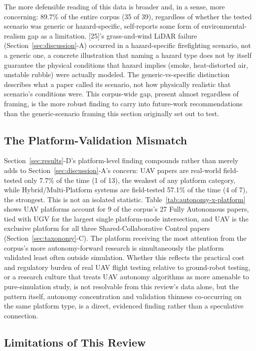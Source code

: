 \documentclass[journal]{IEEEtran}
\begin{document}
The more defensible reading of this data is broader and, in a sense, more concerning: 89.7\% of the entire corpus (35 of 39), regardless of whether the tested scenario was generic or hazard-specific, self-reports some form of environmental-realism gap as a limitation. [25]'s grass-and-wind LiDAR failure (Section~\ref{sec:discussion}-A) occurred in a hazard-specific firefighting scenario, not a generic one, a concrete illustration that naming a hazard type does not by itself guarantee the physical conditions that hazard implies (smoke, heat-distorted air, unstable rubble) were actually modeled. The generic-vs-specific distinction describes what a paper called its scenario, not how physically realistic that scenario's conditions were. This corpus-wide gap, present almost regardless of framing, is the more robust finding to carry into future-work recommendations than the generic-scenario framing this section originally set out to test.

\subsection{The Platform-Validation Mismatch}

Section~\ref{sec:results}-D's platform-level finding compounds rather than merely adds to Section~\ref{sec:discussion}-A's concern: UAV papers are real-world field-tested only 7.7\% of the time (1 of 13), the weakest of any platform category, while Hybrid/Multi-Platform systems are field-tested 57.1\% of the time (4 of 7), the strongest. This is not an isolated statistic. Table~\ref{tab:autonomy-x-platform} shows UAV platforms account for 9 of the corpus's 27 Fully Autonomous papers, tied with UGV for the largest single platform-mode intersection, and UAV is the exclusive platform for all three Shared-Collaborative Control papers (Section~\ref{sec:taxonomy}-C). The platform receiving the most attention from the corpus's more autonomy-forward research is simultaneously the platform validated least often outside simulation. Whether this reflects the practical cost and regulatory burden of real UAV flight testing relative to ground-robot testing, or a research culture that treats UAV autonomy algorithms as more amenable to pure-simulation study, is not resolvable from this review's data alone, but the pattern itself, autonomy concentration and validation thinness co-occurring on the same platform type, is a direct, evidenced finding rather than a speculative connection.

\subsection{Limitations of This Review}
\end{document}
